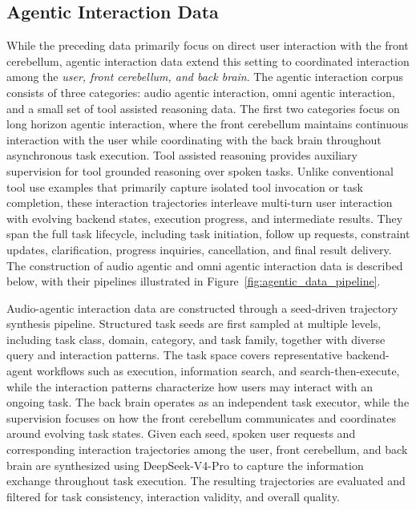 \subsection{Agentic Interaction Data}
While the preceding data primarily focus on direct user interaction with the front cerebellum, agentic interaction data extend this setting to coordinated interaction among the\textit{ user, front cerebellum, and back brain}.
The agentic interaction corpus consists of three categories: audio agentic interaction, omni agentic interaction, and a small set of tool assisted reasoning data. The first two categories focus on long horizon agentic interaction, where the front cerebellum maintains continuous interaction with the user while coordinating with the back brain throughout asynchronous task execution. Tool assisted reasoning provides auxiliary supervision for tool grounded reasoning over spoken tasks. Unlike conventional tool use examples that primarily capture isolated tool invocation or task completion, these interaction trajectories interleave multi-turn user interaction with evolving backend states, execution progress, and intermediate results. They span the full task lifecycle, including task initiation, follow up requests, constraint updates, clarification, progress inquiries, cancellation, and final result delivery. The construction of audio agentic and omni agentic interaction data is described below, with their pipelines illustrated in Figure~\ref{fig:agentic_data_pipeline}. 

Audio-agentic interaction data are constructed through a seed-driven trajectory synthesis pipeline. Structured task seeds are first sampled at multiple levels, including task class, domain, category, and task family, together with diverse query and interaction patterns. The task space covers representative backend-agent workflows such as execution, information search, and search-then-execute, while the interaction patterns characterize how users may interact with an ongoing task. The back brain operates as an independent task executor, while the supervision focuses on how the front cerebellum communicates and coordinates around evolving task states. 
Given each seed, spoken user requests and corresponding interaction trajectories among the user, front cerebellum, and back brain are synthesized using DeepSeek-V4-Pro to capture the information exchange throughout task execution.
The resulting trajectories are evaluated and filtered for task consistency, interaction validity, and overall quality.

